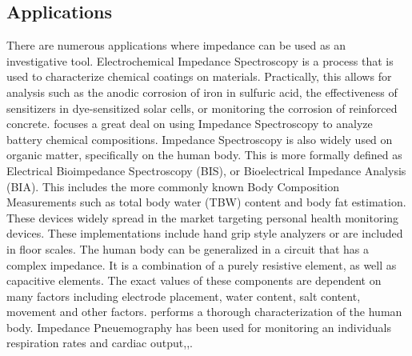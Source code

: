 \documentclass[]{IEEEtran}
\begin{document}
\subsection{Applications}
There are numerous applications where impedance can be used as an investigative tool. Electrochemical Impedance Spectroscopy is a process that is used to characterize chemical coatings on materials\cite{macdonald_reflections_2006}. Practically, this allows for analysis such as the anodic corrosion of iron in sulfuric acid, the effectiveness of sensitizers in dye-sensitized solar cells\cite{wang_electrochemical_2005}, or monitoring the corrosion of reinforced concrete\cite{ribeiro_use_2015}. \cite{barsoukov_impedance_2005} focuses a great deal on using Impedance Spectroscopy to analyze battery chemical compositions. Impedance Spectroscopy is also widely used on organic matter, specifically on the human body. This is more formally defined as Electrical Bioimpedance Spectroscopy (BIS), or Bioelectrical Impedance Analysis (BIA). This includes the more commonly known Body Composition Measurements such as total body water (TBW) content and body fat estimation. These devices widely spread in the market targeting personal health monitoring devices. These implementations include hand grip style analyzers\cite{noauthor_amazon.com:_nodate} or are included in floor scales\cite{noauthor_amazon.com:_nodate-1}.
\newline
The human body can be generalized in a circuit that has a complex impedance. It is a combination of a purely resistive element, as well as capacitive elements. The exact values of these components are dependent on many factors including electrode placement, water content, salt content, movement and other factors.\cite{lukaski_assessment_1985} performs a thorough characterization of the human body. Impedance Pneuemography has been used for monitoring an individuals respiration rates and cardiac output\cite{grenvik_impedance_1972},\cite{larsen_impedance_1984},\cite{ernst_impedance_1999}.
\newline
\end{document}
